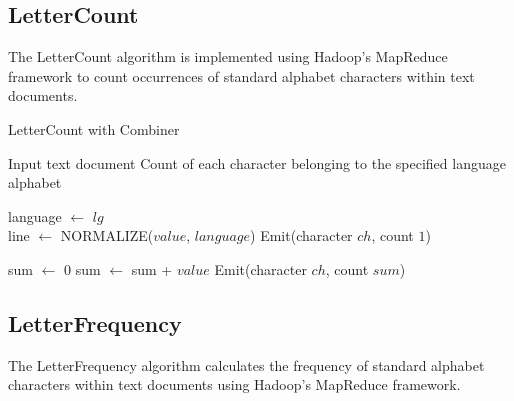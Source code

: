 \subsection{LetterCount}
The LetterCount algorithm is implemented using Hadoop's MapReduce framework to count occurrences of standard alphabet
characters within text documents. \\

\begin{algorithm}
    \caption{LetterCount with Combiner}
    \begin{algorithmic}[1]
        \Require Input text document
        \Ensure Count of each character belonging to the specified language alphabet

        \Statex
                \State language $\gets$ $lg$ 
            \EndMethod\\

                \State line $\gets$ NORMALIZE($value$, $language$) 
                    \State Emit(character $ch$, count $1$) 
                \EndFor
            \EndMethod
        \EndClass

        \Statex
                \State sum $\gets$ 0 
                 
                    \State sum $\gets$ sum + $value$
                \EndFor
                \State Emit(character $ch$, count $sum$) 
            \EndMethod
        \EndClass

    \end{algorithmic}
\end{algorithm}

\newpage

\subsection{LetterFrequency}
The LetterFrequency algorithm calculates the frequency of standard alphabet characters within text documents using Hadoop's MapReduce framework. \\


